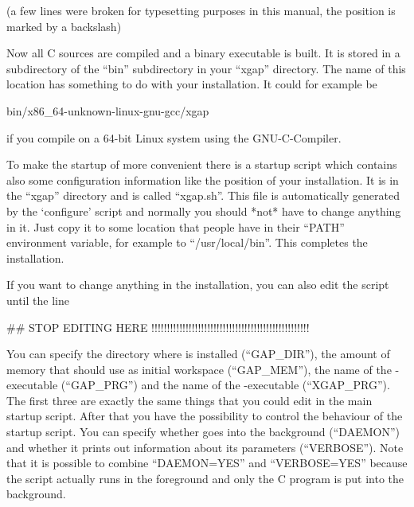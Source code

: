 (a few lines were broken for typesetting purposes in this manual, the
position is marked by a backslash) 

Now all C sources are compiled and a binary executable is built. It is
stored in a subdirectory of the ``bin'' subdirectory in your ``xgap''
directory. The name of this location has something to do with your
installation. It could for example be

\begintt
bin/x86_64-unknown-linux-gnu-gcc/xgap
\endtt

if you compile on a 64-bit Linux system using the GNU-C-Compiler.


To make the startup of {\XGAP} more convenient there is a startup script
which contains also some configuration information like the position of
your {\GAP} installation. It is in the ``xgap'' directory
and is called ``xgap.sh''. This file is automatically generated
by the `configure' script and normally you should *not* have to change 
anything in it. Just copy it to some location that people have in their
``PATH'' environment variable, for example to ``/usr/local/bin''.
This completes the installation.

If you want to change anything in the installation, you
can also edit the script until the line

\begintt
##  STOP EDITING HERE !!!!!!!!!!!!!!!!!!!!!!!!!!!!!!!!!!!!!!!!!!!!!!!!!!!
\endtt

You can specify the directory where {\GAP} is installed (``GAP\_DIR''), 
the amount of memory that {\GAP} should use as initial workspace
(``GAP\_MEM''), the name of the {\GAP}-executable (``GAP\_PRG'') and the
name of the {\XGAP}-executable (``XGAP\_PRG''). The first three are exactly 
the same things that you could edit in the main {\GAP} startup script.
After that you have the possibility to control the behaviour of the {\XGAP}
startup script. You can specify whether {\XGAP} goes into the background
(``DAEMON'') and whether it prints out information about its parameters
(``VERBOSE''). Note that it is possible to combine ``DAEMON=YES''
and ``VERBOSE=YES'' because the script actually runs in the foreground and
only the C program is put into the background.



